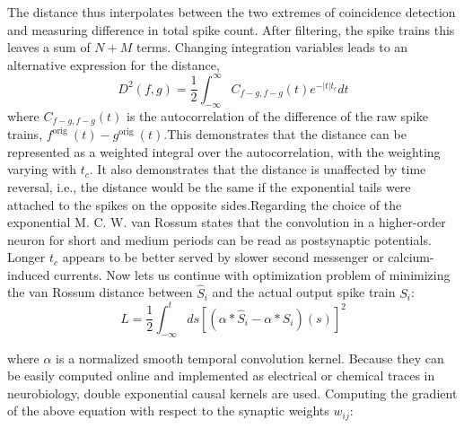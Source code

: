 \documentclass[12pt]{report}
\begin{document}
The distance thus interpolates between the two extremes of coincidence detection and measuring difference in total spike count. After filtering, the spike trains this leaves a sum of $N+M$ terms.
Changing integration variables leads to an alternative expression for the distance,
\begin{equation}
D^{2}(f, g)=\frac{1}{2} \int_{-\infty}^{\infty} C_{f-g, f-g}(t) e^{-|t| t_{c}} d t
\end{equation}
where $C_{f-g, f-g}(t)$ is the autocorrelation of the difference of the raw spike trains, $f^{\text {orig }}(t)-g^{\text {orig }}(t) .$This demonstrates that the distance can be represented as a weighted integral over the autocorrelation, with the weighting varying with $t_{c}$. It also demonstrates that the distance is unaffected by time reversal, i.e., the distance would be the same if the exponential tails were attached to the spikes on the opposite sides.Regarding the choice of the exponential M. C. W. van Rossum states that the convolution in a higher-order neuron for short and medium periods can be read as postsynaptic potentials. Longer $t_{c}$ appears to be better served by slower second messenger or calcium-induced currents. 
Now lets us continue with optimization problem of minimizing the van Rossum distance \cite{rossum2001} between $\hat{S}_{i}$ and the actual output spike train $S_{i}$:
\begin{equation}
L=\frac{1}{2} \int_{-\infty}^{t} d s\left[\left(\alpha * \hat{S}_{i}-\alpha * S_{i}\right)(s)\right]^{2}
\end{equation}

where $\alpha$ is a normalized smooth temporal convolution kernel. Because they can be easily computed online and implemented as electrical or chemical traces in neurobiology, double exponential causal kernels are used. Computing the gradient of the above equation with respect to the synaptic weights $w_{i j}$:
\end{document}
